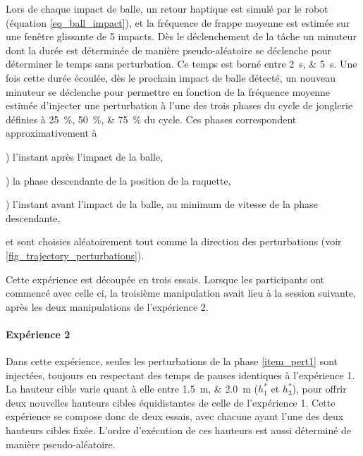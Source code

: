 Lors de chaque impact de balle, un retour haptique est simulé par le robot (équation \cref{eq_ball_impact}), et la fréquence de frappe moyenne est estimée sur une fenêtre glissante de 5 impacts. Dès le déclenchement de la tâche un minuteur dont la durée est déterminée de manière pseudo-aléatoire se déclenche pour déterminer le temps sans perturbation. Ce temps est borné entre \SIlist{2;5}{\second}. Une fois cette durée écoulée, dès le prochain impact de balle détecté, un nouveau minuteur se déclenche pour permettre en fonction de la fréquence moyenne estimée d'injecter une perturbation à l'une des trois phases du cycle de jonglerie définies à \SIlist{25;50;75}{\percent} du cycle. Ces phases correspondent approximativement à
\begin{enumerate*}[label=\textphi\textsubscript{\arabic*}]
	\item)\label{item_pert1} l'instant après l'impact de la balle, 
	\item)\label{item_pert2} la phase descendante de la position de la raquette,
	\item)\label{item_pert3} l'instant avant l'impact de la balle, au minimum de vitesse de la phase descendante,
\end{enumerate*} et sont choisies aléatoirement tout comme la direction des perturbations (voir \cref{fig_trajectory_perturbations}).

\tikzexternalenable


Cette expérience est découpée en trois essais. Lorsque les participants ont commencé avec celle ci, la troisième manipulation avait lieu à la session suivante, après les deux manipulations de l'expérience 2.

\paragraph{Expérience 2} 

Dans cette expérience, seules les perturbations de la phase \cref{item_pert1} sont injectées, toujours en respectant des temps de pauses identiques à l'expérience 1. La hauteur cible varie quant à elle entre \SIlist{1.5;2.0}{\meter} ($h_1^*$ et $h_3^*$), pour offrir deux nouvelles hauteurs cibles équidistantes de celle de l'expérience 1. Cette expérience se compose donc de deux essais, avec chacune ayant l'une des deux hauteurs cibles fixée. L'ordre d'exécution de ces hauteurs est aussi déterminé de manière pseudo-aléatoire.

